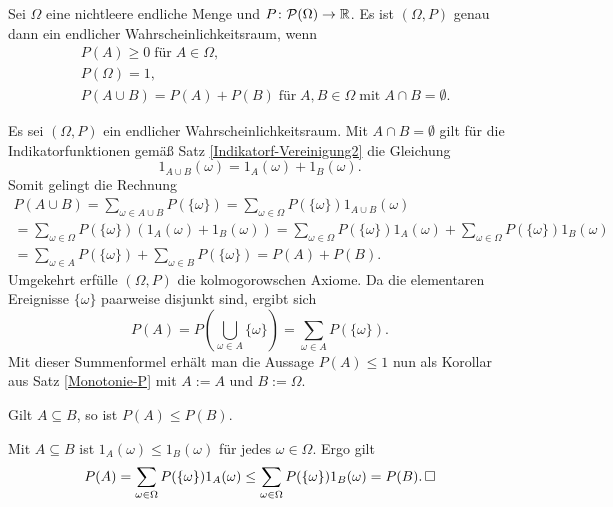 \begin{Satz}\label{Axiome-Kolmogorow}%
\newlinefirst
Sei $\Omega$ eine nichtleere endliche Menge und
$P\colon\mathcal P(\Omega)\to\mathbb R$. Es ist $(\Omega,P)$ genau dann
ein endlicher Wahrscheinlichkeitsraum, wenn
\begin{align*}
& P(A) \ge 0\;\text{für}\;A\in\Omega,\\
& P(\Omega) = 1,\\
& P(A\cup B) = P(A) + P(B)\;\text{für}\;A,B\in\Omega\;
\text{mit}\;A\cap B=\emptyset.
\end{align*}
\end{Satz}
\begin{Beweis}
Es sei $(\Omega,P)$ ein endlicher Wahrscheinlichkeitsraum.
Mit $A\cap B=\emptyset$ gilt für die Indikatorfunktionen
gemäß Satz \ref{Indikatorf-Vereinigung2} die Gleichung
\[1_{A\cup B}(\omega) = 1_A(\omega) + 1_B(\omega).\]
Somit gelingt die Rechnung
\begin{gather*}
P(A\cup B) = \sum_{\omega\in A\cup B}P(\{\omega\})
= \sum_{\omega\in\Omega}P(\{\omega\})1_{A\cup B}(\omega)\\
= \sum_{\omega\in\Omega}P(\{\omega\})(1_A(\omega)+1_B(\omega))
= \sum_{\omega\in\Omega}P(\{\omega\})1_A(\omega)+
\sum_{\omega\in\Omega}P(\{\omega\})1_B(\omega)\\
= \sum_{\omega\in A}P(\{\omega\}) + \sum_{\omega\in B}P(\{\omega\})
= P(A) + P(B).
\end{gather*}
Umgekehrt erfülle $(\Omega,P)$ die kolmogorowschen Axiome. Da die
elementaren Ereignisse $\{\omega\}$ paarweise disjunkt sind, ergibt sich
\[P(A) = P(\bigcup_{\omega\in A}\{\omega\})
= \sum_{\omega\in A} P(\{\omega\}).\]
Mit dieser Summenformel erhält man die Aussage $P(A)\le 1$ nun als Korollar
aus Satz \ref{Monotonie-P} mit $A:=A$ und $B:=\Omega$.\,\qedsymbol
\end{Beweis}

\begin{Satz}\label{Monotonie-P}
Gilt $A\subseteq B$, so ist $P(A)\le P(B)$.
\end{Satz}
\begin{Beweis}
Mit $A\subseteq B$ ist $1_A(\omega)\le 1_B(\omega)$ für jedes $\omega\in\Omega$.
Ergo gilt
\[P(A) = \sum_{\omega\in\Omega} P(\{\omega\})1_A(\omega)
\le \sum_{\omega\in\Omega} P(\{\omega\})1_B(\omega) = P(B).\,\Box\]
\end{Beweis}

